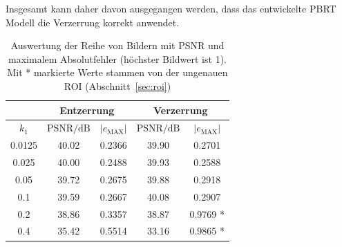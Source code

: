 Insgesamt kann daher davon ausgegangen werden, dass das entwickelte PBRT Modell die Verzerrung korrekt anwendet.

\begin{table}
	\centering
\begin{tabular}{|c|c|c|c|c|}
	\hline 
	\rule[-1ex]{0pt}{2.5ex}  & \multicolumn{2}{c|}{Entzerrung} & \multicolumn{2}{c|}{Verzerrung}  \\ 
	\hline 
	\rule[-1ex]{0pt}{2.5ex} $k_1$ & $\text{PSNR}/\text{dB}$ & $|e_\text{MAX}|$ & $\text{PSNR}/\text{dB}$ & $|e_\text{MAX}|$ \\ 
	\hline 
	\rule[-1ex]{0pt}{2.5ex} 0.0125 & 40.02 & 0.2366 & 39.90 & 0.2701 \\ 
	\hline 
	\rule[-1ex]{0pt}{2.5ex} 0.025 & 40.00 & 0.2488 & 39.93 & 0.2588 \\ 
	\hline 
	\rule[-1ex]{0pt}{2.5ex} 0.05 & 39.72 & 0.2675 & 39.88 & 0.2918 \\ 
	\hline 
	\rule[-1ex]{0pt}{2.5ex} 0.1 & 39.59 & 0.2667 & 40.08 & 0.2907 \\ 
	\hline 
	\rule[-1ex]{0pt}{2.5ex} 0.2 & 38.86 & 0.3357 & 38.87 & 0.9769 * \\ 
	\hline 
	\rule[-1ex]{0pt}{2.5ex} 0.4 & 35.42 & 0.5514 & 33.16 & 0.9865 * \\ 
	\hline 
\end{tabular} 

\caption{Auswertung der Reihe von Bildern mit PSNR und maximalem Absolutfehler (höchster Bildwert ist 1). Mit * markierte Werte stammen von der ungenauen ROI (Abschnitt~\ref{sec:roi})}
\label{tbl:comparison}
\end{table}










 
